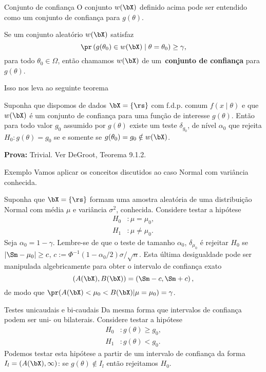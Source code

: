 \begin{frame}{Conjunto de confiança}
 O conjunto $w(\bX)$ definido acima pode ser entendido como um conjunto de confiança para $g(\theta)$.
 \begin{defn}
 \label{def:confidence_set}
  Se um conjunto aleatório $w(\bX)$ satisfaz 
  \[\pr\left(g(\theta_0) \in w(\bX) \mid \theta = \theta_0 \right)  \geq \gamma, \]
  para todo $\theta_0 \in \Omega$, então chamamos $w(\bX)$ de um~\textbf{conjunto de confiança} para $g(\theta)$.
 \end{defn}
 Isso nos leva ao seguinte teorema
 \begin{theo}
 \label{thm:testing_hypotheses_confidence_sets}
  Suponha que dispomos de dados $\bX = \{ \rs \}$ com f.d.p. comum $f(x \mid \theta)$ e que $w(\bX)$ é um conjunto de confiança para uma função de interesse $g(\theta)$. 
  Então para todo valor $g_0$  assumido por $g(\theta)$ existe um teste $\delta_{g_0}$, de nível $\alpha_0$ que rejeita $H_0: g(\theta) = g_0 $ se e somente se $g(\theta_0)  = g_0 \notin w(\bX)$.
 \end{theo}
 \textbf{Prova:} Trivial.
 Ver DeGroot, Teorema 9.1.2.
\end{frame}

\begin{frame}{Exemplo}
 Vamos aplicar os conceitos discutidos ao caso Normal com variância conhecida.
 \begin{exemplo}
 \label{ex:test_normal_mean}
  Suponha que $\bX = \{ \rs \}$ formam uma amostra aleatória de uma distribuição Normal com média $\mu$ e variância $\sigma^2$, conhecida.
  Considere testar a hipótese
  \begin{align*}
   H_0 &:  \mu = \mu_0, \\
   H_1&: \mu \neq \mu_0.
  \end{align*}
  Seja $\alpha_0 = 1-\gamma$. 
  Lembre-se de que o teste de tamanho $\alpha_0$, $\delta_{\mu_0}$ é rejeitar $H_0$ se $|\Sm-\mu_0| \geq c$, $c := \Phi^{-1}\left(1-\alpha_0/2\right)\sigma/\sqrt{n}$.
  Esta última desigualdade pode ser manipulada algebricamente para obter o intervalo de confiança exato
  $$ (A(\bX), B(\bX)) = \left( \Sm - c, \Sm + c\right), $$
  de modo que $\pr(A(\bX) < \mu_0 < B(\bX) | \mu = \mu_0) = \gamma$.
 \end{exemplo}
\end{frame}

\begin{frame}{Testes unicaudais e bi-caudais}
 Da mesma forma que intervalos de confiança podem ser uni- ou bilaterais. 
 Considere testar a hipótese
  \begin{align*}
   H_0 &:  g(\theta) \geq g_0, \\
   H_1&: g(\theta) < g_0.
  \end{align*}
Podemos testar esta hipótese a partir de um intervalo de confiança da forma $I_l = (A(\bX), \infty)$: se $g(\theta) \notin I_l$ então rejeitamos $H_0$.  
\end{frame}

